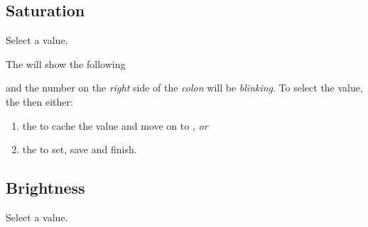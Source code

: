 \pagebreak
\subsection{Saturation} 

Select a  value.

\par\medskip

The  will show the following

\begin{figure}[H]
\centering
\end{figure}

and the number on the \textit{right} side of the \textit{colon} will be
\textit{blinking}.  To select the  value,  the  then
either:

\begin{enumerate}
  \item {} the  to cache the value and move on to ,
    \textit{or}
  \item {} the  to set, save and finish.
\end{enumerate}


\subsection{Brightness} 

Select a  value.

\par\medskip

